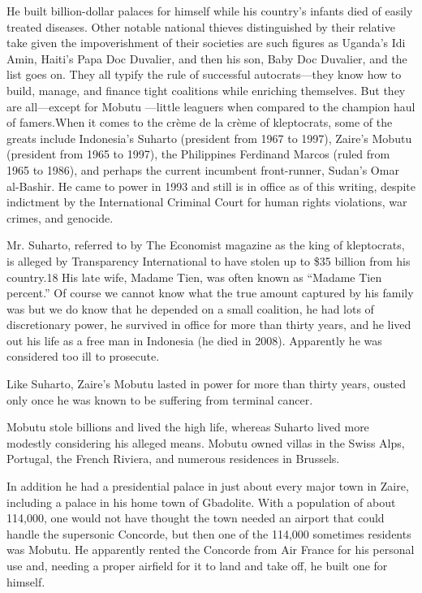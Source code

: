 \documentclass[10pt]{article}
\begin{document}
{\large He built billion-dollar palaces for himself while his country's infants
died of easily treated diseases. Other notable national thieves distinguished by
their relative take given the impoverishment of their societies are such figures
as Uganda's Idi Amin, Haiti's Papa Doc Duvalier, and then his son, Baby Doc
Duvalier, and the list goes on. They all typify the rule of successful
autocrats---they know how to build, manage, and finance tight coalitions while
enriching themselves. But they are all---except for Mobutu ---little leaguers
when compared to the champion haul of famers.When it comes to the cr\`{e}me de la
cr\`{e}me of kleptocrats, some of the greats include Indonesia's Suharto
(president from 1967 to 1997), Zaire's Mobutu (president from 1965 to 1997), the
Philippines Ferdinand Marcos (ruled from 1965 to 1986), and perhaps the current
incumbent front-runner, Sudan's Omar al-Bashir. He came to power in 1993 and
still is in office as of this writing, despite indictment by the International
Criminal Court for human rights violations, war crimes, and genocide.}

{\large Mr. Suharto, referred to by The Economist magazine as the king of
kleptocrats, is alleged by Transparency International to have stolen up to \$35
billion from his country.18 His late wife, Madame Tien, was often known as
``Madame Tien percent.'' Of course we cannot know what the true amount captured
by his family was but we do know that he depended on a small coalition, he had
lots of discretionary power, he survived in office for more than thirty years,
and he lived out his life as a free man in Indonesia (he died in 2008).
Apparently he was considered too ill to prosecute.}

{\large Like Suharto, Zaire's Mobutu lasted in power for more than thirty years,
ousted only once he was known to be suffering from terminal cancer.}

{\large Mobutu stole billions and lived the high life, whereas Suharto lived
more modestly considering his alleged means. Mobutu owned villas in the Swiss
Alps, Portugal, the French Riviera, and numerous residences in Brussels.}

{\large In addition he had a presidential palace in just about every major town
in Zaire, including a palace in his home town of Gbadolite. With a population of
about 114,000, one would not have thought the town needed an airport that could
handle the supersonic Concorde, but then one of the 114,000 sometimes residents
was Mobutu. He apparently rented the Concorde from Air France for his personal
use and, needing a proper airfield for it to land and take off, he built one for
himself.}
\end{document}
